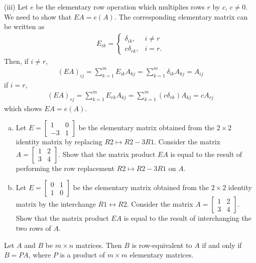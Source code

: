 \documentclass[12pt,letterpaper,reqno]{article}
\numberwithin{equation}{section}
\begin{document}
\begin{pf}
(iii) Let $e$ be the elementary row operation which multiplies rows $r$ by $c$, $c\neq 0$. We need to show that $EA=e(A)$. The corresponding elementary matrix can be written as 
	 \begin{align*}
	 	E_{ik}=\begin{cases}
	 		\delta_{ik}, &i \neq r \\
	 		c\delta_{rk}, &i=r. 
	 	\end{cases}
	 \end{align*}
Then, if $i \neq r$, 
\begin{align*}
	(EA)_{ij}=\sum_{k=1}^m E_{ik}A_{kj} = \sum_{k=1}^m\delta_{ik}A_{kj}=A_{ij}
\end{align*}
if $i=r$,
\begin{align*}
	(EA)_{rj}=\sum_{k=1}^m E_{rk}A_{kj} =\sum_{k=1}^m(c\delta_{rk})A_{kj} =cA_{rj}
\end{align*}
which shows $EA=e(A)$.	
\end{pf}

\begin{exercise}
\begin{enumerate}[(a)]
    \item Let $E=\begin{bmatrix} 1 & 0 \\ -3 & 1 \end{bmatrix}$ be the elementary matrix obtained from the $2 \times 2$ identity matrix by replacing $R2 \mapsto R2-3R1$. Consider the matrix $A=\begin{bmatrix} 1& 2 \\ 3 & 4 \end{bmatrix}$. Show that the matrix product $EA$ is equal to the result of performing the row replacement $R2 \mapsto R2-3R1$ on $A$.
    \item Let $E=\begin{bmatrix} 0 & 1 \\ 1 & 0 \end{bmatrix}$ be the elementary matrix obtained from the $2 \times 2$ identity matrix by the interchange $R1 \leftrightarrow R2$. Consider the matrix $A=\begin{bmatrix} 1& 2 \\ 3 & 4 \end{bmatrix}$. Show that the matrix product $EA$ is equal to the result of interchanging the two rows of $A$.
\end{enumerate}
\end{exercise}


\begin{cor}
Let $A$ and $B$ be $m \times n$ matrices. Then $B$ is row-equivalent to $A$ if and only if $B=PA$, where $P$ is a product of $m \times m$ elementary matrices.	
\end{cor}
\end{document}
